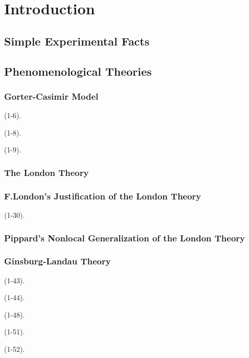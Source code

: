 \chapter{Introduction} %
\label{cha:Introduction}

\section{Simple Experimental Facts} %
\label{sec:Simple Experimental Facts}

\section{Phenomenological Theories} %
\label{sec:Phenomenological Theories}
\subsection{Gorter-Casimir Model} %
\label{sub:Gorter-Casimir Model}
(1-6). 

(1-8). 

(1-9). 
\subsection{The London Theory} %
\label{sub:The London Theory}

\subsection{F.London's Justification of the London Theory} %
\label{sub:F.London's Justification of the London Theory}
(1-30). 
\subsection{Pippard's Nonlocal Generalization of the London Theory} %
\label{sub:Pippard's Nonlocal Generalization of the London Theory}

\subsection{Ginsburg-Landau Theory} %
\label{sub:Ginsburg-Landau Theory}
(1-43). 

(1-44). 

(1-48). 

(1-51). 

(1-52). 
